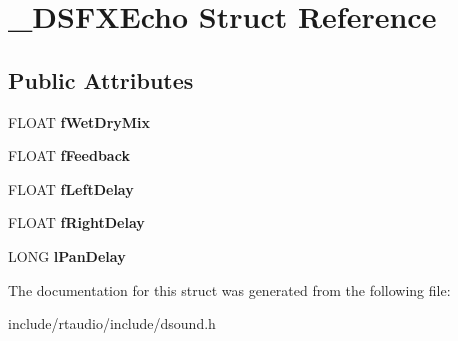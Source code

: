 \hypertarget{struct___d_s_f_x_echo}{}\section{\+\_\+\+D\+S\+F\+X\+Echo Struct Reference}
\label{struct___d_s_f_x_echo}
\subsection*{Public Attributes}
\begin{DoxyCompactItemize}
\item 
F\+L\+O\+AT {\bfseries f\+Wet\+Dry\+Mix}\hypertarget{struct___d_s_f_x_echo_ab88148b1499dd607b2113b8236f8ca6c}{}\label{struct___d_s_f_x_echo_ab88148b1499dd607b2113b8236f8ca6c}

\item 
F\+L\+O\+AT {\bfseries f\+Feedback}\hypertarget{struct___d_s_f_x_echo_a059b8e0cd751e4ad4082f8e6f0508c7b}{}\label{struct___d_s_f_x_echo_a059b8e0cd751e4ad4082f8e6f0508c7b}

\item 
F\+L\+O\+AT {\bfseries f\+Left\+Delay}\hypertarget{struct___d_s_f_x_echo_a9dd19efc0a5a27f476ec1287a99438f7}{}\label{struct___d_s_f_x_echo_a9dd19efc0a5a27f476ec1287a99438f7}

\item 
F\+L\+O\+AT {\bfseries f\+Right\+Delay}\hypertarget{struct___d_s_f_x_echo_ab0c47504a47bd4491fa64c786067aa72}{}\label{struct___d_s_f_x_echo_ab0c47504a47bd4491fa64c786067aa72}

\item 
L\+O\+NG {\bfseries l\+Pan\+Delay}\hypertarget{struct___d_s_f_x_echo_a0356db42f396f32d527e41d841dd8c9d}{}\label{struct___d_s_f_x_echo_a0356db42f396f32d527e41d841dd8c9d}

\end{DoxyCompactItemize}


The documentation for this struct was generated from the following file\+:\begin{DoxyCompactItemize}
\item 
include/rtaudio/include/dsound.\+h\end{DoxyCompactItemize}
